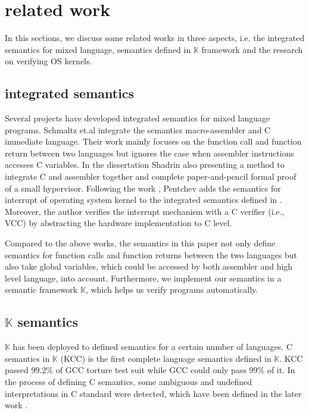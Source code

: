 \documentclass[letterpaper, 10 pt, conference]{IEEEtran}
\begin{document}
\section{related work}
\par In this sections, we discuss some related works in three aspects, i.e. the integrated semantics for mixed language, semantics defined in $\mathbb{K}$ framework and the research on verifying OS kernels.
\subsection{integrated semantics}
Several projects have developed integrated semantics for mixed language programs. Schmaltz \cite{Schmaltz} et.al integrate the semantics    macro-assembler and C immediate language. Their work mainly focuses on the function call and function return between two languages but ignores the case when assembler instructions accesses C variables. In the dissertation  \cite{Shadrin} Shadrin also presenting a method to integrate C and assembler together and complete paper-and-pencil
formal proof of a small hypervisor. Following the work \cite{Shadrin}, Pentchev \cite{Pentchev} adds the semantics for interrupt of operating system kernel to the integrated semantics defined in \cite{Shadrin}. Moreover, the author verifies the interrupt mechanism with a C verifier (i.e., VCC) by abstracting the hardware implementation to C level.
\par Compared to the above works, the semantics in this paper not only define semantics for function calls and function returns between the two languages but also take global variables, which could be accessed by both assembler and high level language, into account. Furthermore, we implement our semantics in a semantic framework $\mathbb{K}$, which helps us verify programs automatically.
\subsection{$\mathbb{K}$ semantics}
\par $\mathbb{K}$ has been deployed to defined semantics for a certain number of languages. C semantics in $\mathbb{K}$ (KCC) is the first complete language semantics defined in $\mathbb{K}$. KCC passed 99.2\% of GCC torture test suit while GCC could only pass 99\% of it. In the process of defining C semantics, some ambiguous and undefined interpretations in C standard were detected, which have been defined in the later work \cite{undefinedkcc}.
\end{document}
